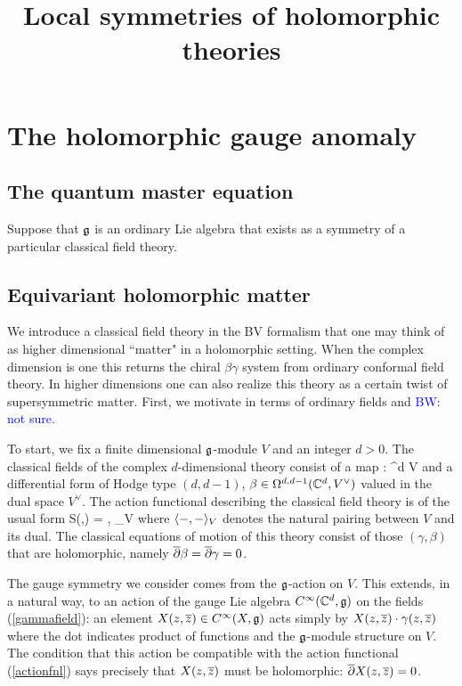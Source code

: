 \documentclass[10pt]{amsart}
\title{Local symmetries of holomorphic theories}
\def\brian{\textcolor{blue}{BW: }\textcolor{blue}}
\begin{document}
\maketitle
\tableofcontents

\section{The holomorphic gauge anomaly}

\subsection{The quantum master equation} 

Suppose that $\mathfrak g$ is an ordinary Lie algebra that exists as a symmetry of a particular classical field theory. 

\subsection{Equivariant holomorphic matter}

We introduce a classical field theory in the BV formalism that one may think of as higher dimensional ``matter" in a holomorphic setting. 
When the complex dimension is one this returns the chiral $\beta\gamma$ system from ordinary conformal field theory. 
In higher dimensions one can also realize this theory as a certain twist of supersymmetric matter. 
First, we motivate in terms of ordinary fields and \brian{not sure}. 

To start, we fix a finite dimensional $\mathfrak g$-module $V$ and an integer $d > 0$.
The classical fields of the complex $d$-dimensional theory consist of a map
\be\label{gammafield}
\gamma : \CC^d \to V
\ee
and a differential form of Hodge type $(d,d-1)$, $\beta \in \Omega^{d,d-1}(\mathbb C^d, V^\vee)$ valued in the dual space $V^\vee$. 
The action functional describing the classical field theory is of the usual form
\be\label{actionfnl}
S(\gamma,\beta) = \int \<\beta, \dbar\gamma\>_V
\ee
where $\langle-,-\rangle_V$ denotes the natural pairing between $V$ and its dual. 
The classical equations of motion of this theory consist of those $(\gamma,\beta)$ that are holomorphic, namely $\overline{\partial} \beta = \overline{\partial} \gamma = 0$. 

The gauge symmetry we consider comes from the $\mathfrak g$-action on $V$. 
This extends, in a natural way, to an action of the gauge Lie algebra $C^\infty(\mathbb C^d, \mathfrak g)$ on the fields (\ref{gammafield}): an element $X(z,\overline{z}) \in C^\infty(X,\mathfrak g)$ acts simply by $X(z,\overline{z}) \cdot \gamma(z,\overline{z})$ where the dot indicates product of functions and the $\mathfrak g$-module structure on $V$. 
The condition that this action be compatible with the action functional (\ref{actionfnl}) says precisely that $X(z,\overline{z})$ must be holomorphic: $\overline{\partial} X(z,\overline{z}) = 0$. 
\end{document}
